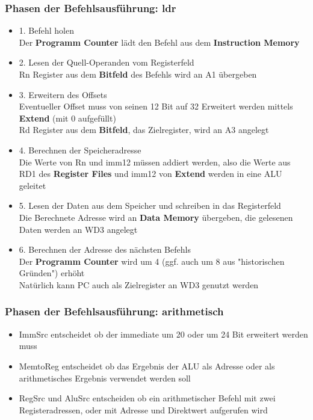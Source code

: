 		\subsubsection{Phasen der Befehlsausführung: ldr}
			\begin{itemize}
				\item 1. Befehl holen \\
					Der \textbf{Programm Counter} lädt den Befehl aus dem \textbf{Instruction Memory}
				\item 2. Lesen der Quell-Operanden vom Registerfeld \\
					Rn Register aus dem \textbf{Bitfeld} des Befehls wird an A1 übergeben 
				\item 3. Erweitern des Offsets \\
					Eventueller Offset muss von seinen 12 Bit auf 32 Erweitert
					werden mittels \textbf{Extend} (mit 0 aufgefüllt) \\
					Rd Register aus dem \textbf{Bitfeld}, das Zielregister, wird an A3 angelegt
				\item 4. Berechnen der Speicheradresse \\
					Die Werte von Rn und imm12 müssen addiert werden, also die Werte aus RD1
					des \textbf{Register Files} und imm12 von \textbf{Extend} werden in eine ALU geleitet
				\item 5. Lesen der Daten aus dem Speicher und schreiben in das Registerfeld \\
					Die Berechnete Adresse wird an \textbf{Data Memory} übergeben, die gelesenen Daten
					werden an WD3 angelegt
				\item 6. Berechnen der Adresse des nächsten Befehls \\
					Der \textbf{Programm Counter} wird um 4 (ggf. auch um 8 aus "historischen Gründen") erhöht \\
					Natürlich kann PC auch als Zielregister an WD3 genutzt werden
			\end{itemize}

		\subsubsection{Phasen der Befehlsausführung: arithmetisch}
			\begin{itemize}
				\item ImmSrc entscheidet ob der immediate um 20 oder um 24 Bit erweitert werden muss
				\item MemtoReg entscheidet ob das Ergebnis der ALU als Adresse oder als arithmetisches
					Ergebnis verwendet werden soll
				\item RegSrc und AluSrc entscheiden ob ein arithmetischer Befehl mit zwei Registeradressen,
					oder mit Adresse und Direktwert aufgerufen wird
			\end{itemize}

